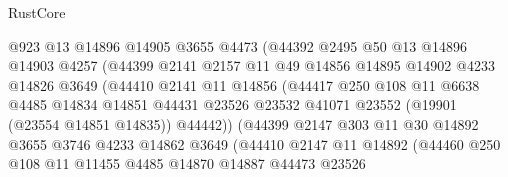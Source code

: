 \begin{lexlean}{RustCore}
\begin{coremodule}
                          @923
                          @13
                          @14896
                          @14905
                          @3655
                          @4473
                          (@44392
                            @2495
                            @50
                            @13
                            @14896
                            @14903
                            @4257
                            (@44399
                              @2141
                              @2157
                              @11
                              @49
                              @14856
                              @14895
                              @14902
                              @4233
                              @14826
                              @3649
                              (@44410
                                @2141
                                @11
                                @14856
                                (@44417
                                  @250
                                  @108
                                  @11
                                  @6638
                                  @4485
                                  @14834
                                  @14851
                                  @44431
                                  @23526
                                  @23532
                                  @41071
                                  @23552
                                  (@19901 (@23554 @14851 @14835))
                                  @44442))
                              (@44399
                                @2147
                                @303
                                @11
                                @30
                                @14892
                                @3655
                                @3746
                                @4233
                                @14862
                                @3649
                                (@44410
                                  @2147
                                  @11
                                  @14892
                                  (@44460
                                    @250
                                    @108
                                    @11
                                    @11455
                                    @4485
                                    @14870
                                    @14887
                                    @44473
                                    @23526

\end{coremodule}
\end{lexlean}
